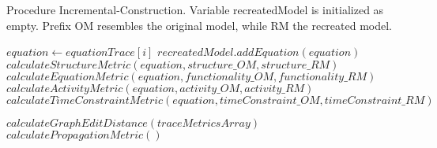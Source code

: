 	
	\begin{algorithm}
	\caption{Procedure Incremental-Construction. Variable recreatedModel is initialized as empty. Prefix OM resembles the original model, while RM the recreated model. }
	\label{incrementalConstruction}
	\begin{algorithmic}[1]
			\State $equation \gets equationTrace[i]$
			\State $recreatedModel.addEquation(equation)$
			\State $calculateStructureMetric(equation, structure\_OM, structure\_RM)$
			\State $calculateEquationMetric(equation, functionality\_OM, functionality\_RM)$
			\State $calculateActivityMetric(equation, activity\_OM, activity\_RM)$
			\State $calculateTimeConstraintMetric(equation, timeConstraint\_OM, timeConstraint\_RM)$
		\EndFor
		
		\State $calculateGraphEditDistance(traceMetricsArray)$
		\State $calculatePropagationMetric()$
				
		\EndProcedure
	\end{algorithmic}
	\end{algorithm}